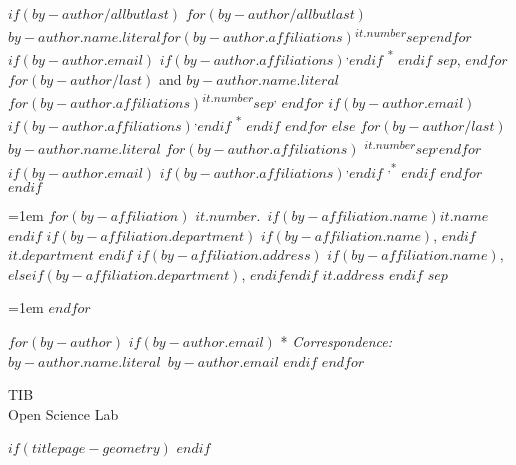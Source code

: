 \begin{tcolorbox}

$if(by-author/allbutlast)$
  $for(by-author/allbutlast)$
    {\large{$by-author.name.literal$}}$for(by-author.affiliations)${\textsuperscript{$it.number$}}$sep$\textsuperscript{,}$endfor$%
  $if(by-author.email)$%
  $if(by-author.affiliations)$\textsuperscript{,}$endif$%
  {\textsuperscript{*}}%
  $endif$%
  $sep$, 
  $endfor$
  $for(by-author/last)$%
    { and \large{$by-author.name.literal$}}%
  $for(by-author.affiliations)${\textsuperscript{$it.number$}}$sep$\textsuperscript{,}%
  $endfor$%
  $if(by-author.email)$%
    $if(by-author.affiliations)$\textsuperscript{,}$endif$%
    {\textsuperscript{*}}%
  $endif$%
  $endfor$
  $else$
  $for(by-author/last)$%
    {\large{$by-author.name.literal$}}%
    $for(by-author.affiliations)$%
    {\textsuperscript{$it.number$}}$sep$\textsuperscript{,}$endfor$%
  $if(by-author.email)$%
    $if(by-author.affiliations)$\textsuperscript{,}$endif$%
    {\textsuperscript{,*}}%
$endif$%
$endfor$
$endif$

\vspace{2\baselineskip} 

\hangindent=1em
$for(by-affiliation)$%
{$it.number$}.~$if(by-affiliation.name)${$it.name$}$endif$%
$if(by-affiliation.department)$%
$if(by-affiliation.name)$, $endif$%
{$it.department$}%
$endif$%
$if(by-affiliation.address)$%
$if(by-affiliation.name)$, $else$$if(by-affiliation.department)$, $endif$$endif$%
{$it.address$}%
$endif$%
$sep$\par\hangindent=1em%
$endfor$

\vspace{1\baselineskip} 

$for(by-author)$
$if(by-author.email)$
* \textit{Correspondence:}~$by-author.name.literal$~$by-author.email$\newline
$endif$
$endfor$

\end{tcolorbox}


\vfill

\vspace{1\baselineskip} 

\begin{tcolorbox}
\centering

{
  TIB\\
  Open Science Lab
}
\end{tcolorbox}

$if(titlepage-geometry)$
  \restoregeometry
$endif$
